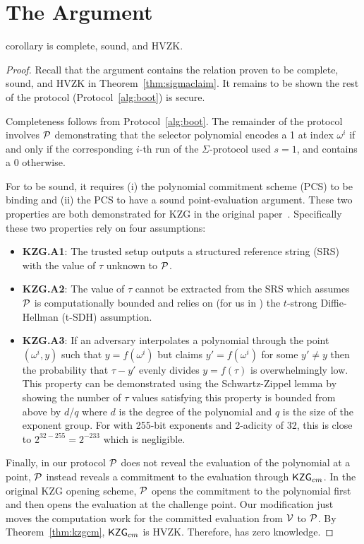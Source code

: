 
\section{The \bootstrap Argument}

\begin{restatable}{corollary}{}
\label{thm:keys}
\bootstrap is complete, sound, and HVZK.
\end{restatable}

\begin{proof}
Recall that the \bootstrap argument contains the relation proven to be complete, sound, and HVZK in Theorem~\ref{thm:sigmaclaim}. It remains to be shown the rest of the protocol (Protocol~\ref{alg:boot}) is secure.

Completeness follows from Protocol~\ref{alg:boot}. The remainder of the protocol involves $\mathcal{P}$ demonstrating that the selector polynomial encodes a 1 at index $\omega^i$ if and only if the corresponding $i$-th run of the $\Sigma$-protocol used $s=1$, and contains a 0 otherwise.

For \bootstrap to be sound, it requires (i) the polynomial commitment scheme (PCS) to be binding and (ii) the PCS to have a sound point-evaluation argument. These two properties are both demonstrated for KZG in the original paper~\cite{kzg}. Specifically these two properties rely on four assumptions:
\begin{itemize}
\item \textbf{KZG.A1}: The trusted setup outputs a structured reference string (SRS) with the value of $\tau$ unknown to $\mathcal{P}$. 
\item \textbf{KZG.A2}: The value of $\tau$ cannot be extracted from the SRS which assumes $\mathcal{P}$ is computationally bounded and relies on (for us in \bls) the $t$-strong Diffie-Hellman (t-SDH) assumption.
\item \textbf{KZG.A3}: If an adversary interpolates a polynomial through the point $(\omega^i,y)$ such that $y=f(\omega^i)$ but claims $y'=f(\omega^i)$ for some $y'\neq y$ then the probability that $\tau-y'$ evenly divides $y=f(\tau)$ is overwhelmingly low. This property can be demonstrated using the Schwartz-Zippel lemma by showing the number of $\tau$ values satisfying this property is bounded from above by $d$/$q$ where $d$ is the degree of the polynomial and $q$ is the size of the exponent group. For \bls with 255-bit exponents and 2-adicity of 32, this is close to $2^{32-255}=2^{-233}$ which is negligible.
\end{itemize}

Finally, in our protocol $\mathcal{P}$ does not reveal the evaluation of the polynomial at a point, $\mathcal{P}$ instead reveals a commitment to the evaluation through $\mathsf{KZG}_{cm}$. In the original KZG opening scheme, $\mathcal{P}$ opens the commitment to the polynomial first and then opens the evaluation at the challenge point. Our modification just moves the computation work for the committed evaluation from $\mathcal{V}$ to $\mathcal{P}$. By Theorem~\ref{thm:kzgcm}, $\mathsf{KZG}_{cm}$ is HVZK. Therefore, \bootstrap has zero knowledge.
\end{proof}

